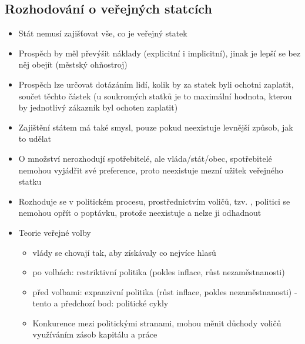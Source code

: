 \subsection{Rozhodování o veřejných statcích}
\begin{itemize}
    \item Stát nemusí zajišťovat vše, co je veřejný statek
    \item Prospěch by měl převýšit náklady (explicitní i implicitní), jinak je lepší se bez něj obejít (městský ohňostroj)
    \item Prospěch lze určovat dotázáním lidí, kolik by za statek byli ochotni zaplatit, součet těchto částek 
    (u soukromých statků je to maximální hodnota, kterou by jednotlivý zákazník byl ochoten zaplatit)
    \item Zajištění státem má také smysl, pouze pokud neexistuje levnější způsob, jak to udělat
    \item O množství nerozhodují spotřebitelé, ale vláda/stát/obec, spotřebitelé nemohou vyjádřit své preference,
    proto neexistuje mezní užitek veřejného statku
    \item Rozhoduje se v politickém procesu, prostřednictvím voličů, tzv. , politici se nemohou opřít
    o poptávku, protože neexistuje a nelze ji odhadnout
    \item Teorie veřejné volby
    \begin{itemize}
        \item vlády se chovají tak, aby získávaly co nejvíce hlasů
        \item po volbách: restriktivní politika (pokles inflace, růst nezaměstnanosti)
        \item před volbami: expanzivní politika (růst inflace, pokles nezaměstnanosti) - tento a předchozí bod: politické
        cykly
        \item Konkurence mezi politickými stranami, mohou měnit důchody voličů využíváním zásob kapitálu a práce
    \end{itemize}
\end{itemize}

